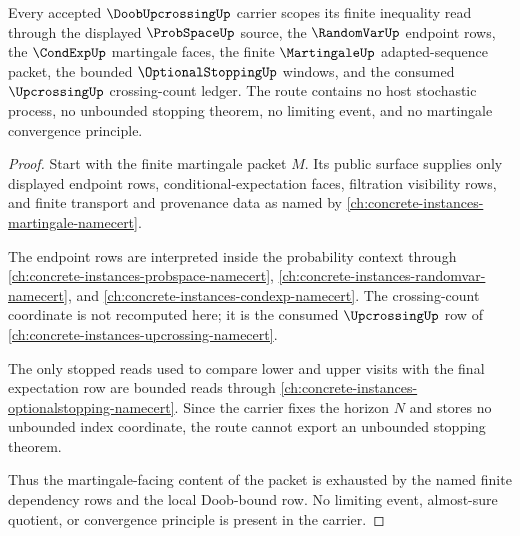 \begin{theorem}
\label{thm:doob-upcrossing-martingale-route}
Every accepted $\DoobUpcrossingUp$ carrier scopes its finite inequality read through the displayed $\ProbSpaceUp$ source, the $\RandomVarUp$ endpoint rows, the $\CondExpUp$ martingale faces, the finite $\MartingaleUp$ adapted-sequence packet, the bounded $\OptionalStoppingUp$ windows, and the consumed $\UpcrossingUp$ crossing-count ledger. The route contains no host stochastic process, no unbounded stopping theorem, no limiting event, and no martingale convergence principle.
\end{theorem}
\begin{proof}
Start with the finite martingale packet $M$. Its public surface supplies only displayed endpoint rows, conditional-expectation faces, filtration visibility rows, and finite transport and provenance data as named by \autoref{ch:concrete-instances-martingale-namecert}.

The endpoint rows are interpreted inside the probability context through \autoref{ch:concrete-instances-probspace-namecert}, \autoref{ch:concrete-instances-randomvar-namecert}, and \autoref{ch:concrete-instances-condexp-namecert}. The crossing-count coordinate is not recomputed here; it is the consumed $\UpcrossingUp$ row of \autoref{ch:concrete-instances-upcrossing-namecert}.

The only stopped reads used to compare lower and upper visits with the final expectation row are bounded reads through \autoref{ch:concrete-instances-optionalstopping-namecert}. Since the carrier fixes the horizon $N$ and stores no unbounded index coordinate, the route cannot export an unbounded stopping theorem.

Thus the martingale-facing content of the packet is exhausted by the named finite dependency rows and the local Doob-bound row. No limiting event, almost-sure quotient, or convergence principle is present in the carrier.
\end{proof}

